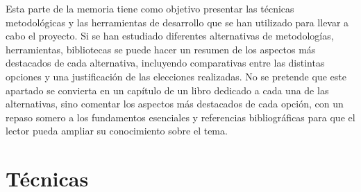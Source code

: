 
Esta parte de la memoria tiene como objetivo presentar las técnicas metodológicas y las herramientas de desarrollo que se han utilizado para llevar a cabo el proyecto. Si se han estudiado diferentes alternativas de metodologías, herramientas, bibliotecas se puede hacer un resumen de los aspectos más destacados de cada alternativa, incluyendo comparativas entre las distintas opciones y una justificación de las elecciones realizadas. 
No se pretende que este apartado se convierta en un capítulo de un 
libro dedicado a cada una de las alternativas, sino comentar los aspectos 
más destacados de cada opción, con un repaso somero a los fundamentos 
esenciales y referencias bibliográficas para que el lector pueda ampliar 
su conocimiento sobre el tema.

\section{Técnicas}

